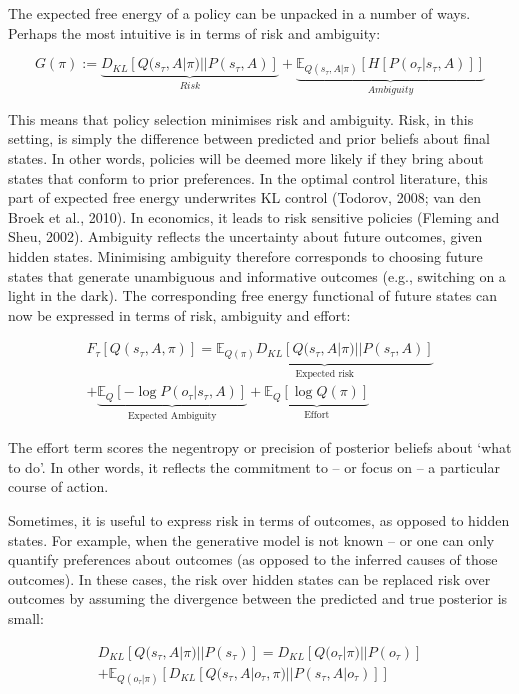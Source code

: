 \documentclass{article}
\theoremstyle{plain}
\theoremstyle{definition}
\theoremstyle{proposition}
\theoremstyle{corollary}
\theoremstyle{lemma}
\theoremstyle{remark}
\theoremstyle{example}
\begin{document}
The expected free energy of a policy can be unpacked in a number of ways. Perhaps the most intuitive is in terms of risk and ambiguity:

\begin{equation}
    G(\pi) := \underbrace{D_{KL}[Q(s_\tau, A|\pi)||P(s_\tau, A)]}_{Risk}+ \underbrace{\mathbb E_{Q(s_\tau, A|\pi)}[ H [ P(o_\tau |s_\tau, A)]]}_{Ambiguity}
\end{equation}

This means that policy selection minimises risk and ambiguity. Risk, in this setting, is simply the difference between predicted and prior beliefs about final states. In other words, policies will be deemed more likely if they bring about states that conform to prior preferences. In the optimal control literature, this part of expected free energy underwrites KL control (Todorov, 2008; van den Broek et al., 2010). In economics, it leads to risk sensitive policies (Fleming and Sheu, 2002). Ambiguity reflects the uncertainty about future outcomes, given hidden states. Minimising ambiguity therefore corresponds to choosing future states that generate unambiguous and informative outcomes (e.g., switching on a light in the dark). The corresponding free energy functional of future states can now be expressed in terms of risk, ambiguity and effort:

\begin{multline}
        F_\tau [Q(s_\tau, A,\pi)]= \underbrace{\mathbb E_{Q(\pi)}D_{KL}[Q(s_\tau, A|\pi)||P(s_\tau, A)]}_{\text{Expected risk}}\\ + \underbrace{\mathbb E_Q[-\log P(o_\tau |s_\tau,A)]}_{\text{Expected Ambiguity}}+ \underbrace{\mathbb E_Q[\log Q(\pi)]}_{\text{Effort}}
\end{multline}

The effort term scores the negentropy or precision of posterior beliefs about ‘what to do’. In other words, it reflects the commitment to – or focus on – a particular course of action.

Sometimes, it is useful to express risk in terms of outcomes, as opposed to hidden states. For example, when the generative model is not known – or one can only quantify preferences about outcomes (as opposed to the inferred causes of those outcomes). In these cases, the risk over hidden states can be replaced risk over outcomes by assuming the divergence between the predicted and true posterior is small:

\begin{multline}
    D_{KL}[Q(s_\tau, A|\pi)||P(s_\tau)]=D_{KL}[Q(o_\tau|\pi)||P(o_\tau)]\\+\mathbb E_{Q(o_\tau |\pi)}[D_{KL}[Q(s_\tau, A|o_\tau, \pi)||P(s_\tau, A|o_\tau)]] 
\end{multline}
\end{document}
